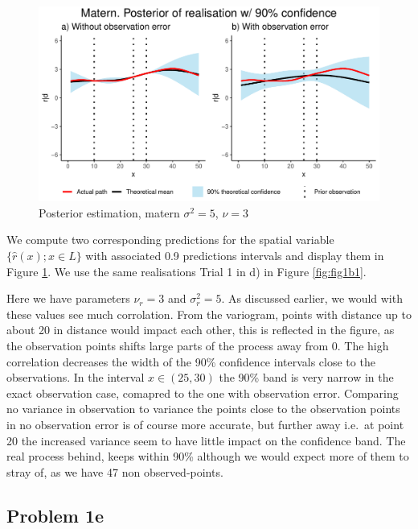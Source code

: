 \documentclass[]{article}
\begin{document}
\begin{figure}

{\centering \includegraphics{Exercise-1_files/figure-latex/fig1d1-1} 

}

\caption{\label{fig:fig1d1} Posterior estimation, matern $\sigma^2 = 5$, $\nu = 3$}\label{fig:fig1d1}
\end{figure}

We compute two corresponding predictions for the spatial variable
\(\lbrace \hat r(x);x \in L\rbrace\) with associated 0.9 predictions
intervals and display them in Figure \ref{fig:fig1d1}. We use the same
realisations Trial 1 in d) in Figure \ref{fig:fig1b1}.

Here we have parameters \(\nu_r = 3\) and \(\sigma_r^2 = 5\). As
discussed earlier, we would with these values see much corrolation. From
the variogram, points with distance up to about 20 in distance would
impact each other, this is reflected in the figure, as the observation
points shifts large parts of the process away from 0. The high
correlation decreases the width of the 90\% confidence intervals close
to the observations. In the interval \(x\in (25,30)\) the 90\% band is
very narrow in the exact observation case, comapred to the one with
observation error. Comparing no variance in observation to variance the
points close to the observation points in no observation error is of
course more accurate, but further away i.e.~at point 20 the increased
variance seem to have little impact on the confidence band. The real
process behind, keeps within 90\% although we would expect more of them
to stray of, as we have 47 non observed-points.

\hypertarget{problem-1e}{%
\subsection{Problem 1e}\label{problem-1e}}
\end{document}
